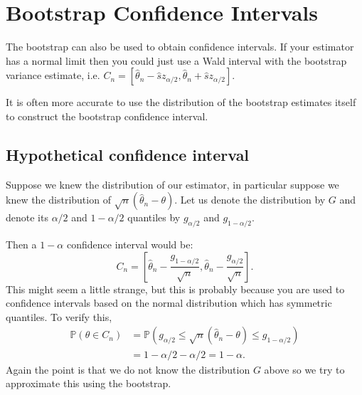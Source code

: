 \documentclass[twoside,12pt]{article}
\begin{document}
\section{Bootstrap Confidence Intervals}
The bootstrap can also be used to obtain confidence intervals. If your estimator has a normal limit then you could just use a Wald interval with the bootstrap variance estimate, i.e. $C_n = [ \widehat{\theta}_n - \widehat{s} z_{\alpha/2}, \widehat{\theta}_n + \widehat{s} z_{\alpha/2}].$

It is often more accurate to use the distribution of the bootstrap estimates itself to construct the bootstrap confidence interval.

\subsection{Hypothetical confidence interval}
Suppose we knew the distribution of our estimator, in particular suppose we knew the distribution of $\sqrt{n} (\widehat{\theta}_n - \theta)$. Let us denote the distribution by $G$ and denote its $\alpha/2$ and $1-\alpha/2$ quantiles by $g_{\alpha/2}$ and $g_{1 - \alpha/2}$.

Then a $1 - \alpha$ confidence interval would be:
$$C_n = \left[\widehat{\theta}_n - \frac{g_{1 - \alpha/2}}{\sqrt{n}}, \widehat{\theta}_n - \frac{g_{\alpha/2}}{\sqrt{n}} \right].$$
This might seem a little strange, but this is probably because you are used to confidence intervals based on the normal distribution which has symmetric quantiles. To verify this, 
\begin{align*}
\mathbb{P}(\theta \in C_n) &= \mathbb{P}\left(g_{\alpha/2} \leq \sqrt{n} (\widehat{\theta}_n - \theta) \leq g_{1 - \alpha/2}\right)\\
&= 1 - \alpha/2 - \alpha/2 = 1 - \alpha. 
\end{align*}
Again the point is that we do not know the distribution $G$ above so we try to approximate this using the bootstrap.
\end{document}
